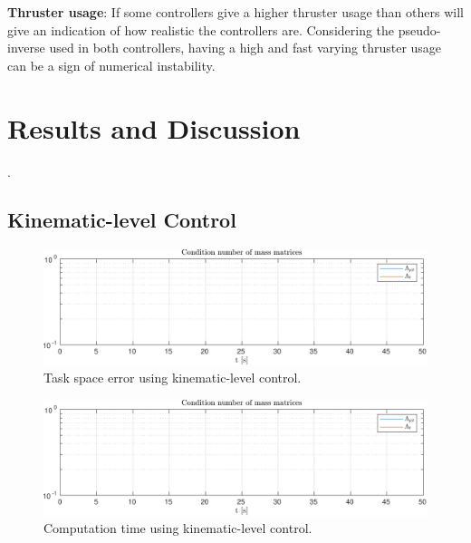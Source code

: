 \textbf{Thruster usage}: If some controllers give a higher thruster usage than others
will give an indication of how realistic the controllers are. Considering the
pseudo-inverse used in both controllers, having a high and fast varying thruster
usage can be a sign of numerical instability.


\newpage
\section{Results and Discussion}
\label{sec:simulation:results}.

\subsection{Kinematic-level Control}

\begin{figure}[h!]
    \centering
    \includegraphics[page=2,width=\linewidth]{assets/results/kinematic/h5data.pdf}
    \caption{Task space error using kinematic-level control.}
    \label{}
\end{figure}
\begin{figure}[h!]
    \centering
    \includegraphics[page=3,width=\linewidth]{assets/results/kinematic/h5data.pdf}
    \caption{Computation time using kinematic-level control.}
    \label{}
\end{figure}

